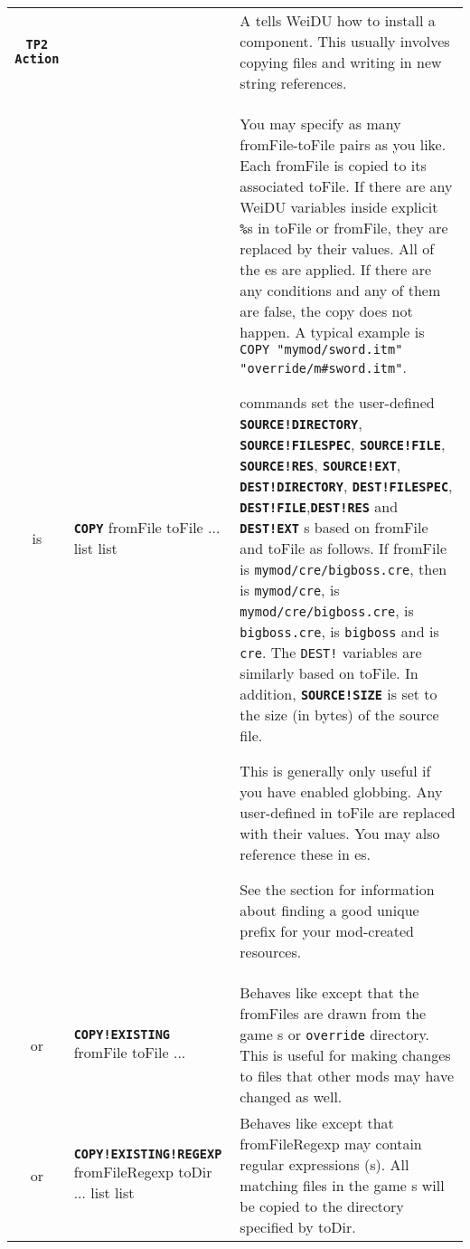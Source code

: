 \documentclass{article}
\def\ttref#1{\ahrefloc{#1}{\tt #1}}
\def\DEFINE#1{{\tt \bf #1}\label{#1}\index{#1}}
\def\t#1{{\tt #1}}
\def\Slist{{\color{red} list }}
\begin{document}
\begin{tabular}{cp{10in}|p{10in}}
\DEFINE{TP2 Action} & &
  A \ttref{TP2 Action} tells WeiDU how to install a component. This usually
  involves copying files and writing in new string references. \\

  is & \DEFINE{COPY} \ttref{optNoBackup}
                     \ttref{optGlob} fromFile toFile ...
       \ttref{patch} \Slist
       \ttref{when} \Slist &
       You may specify as many fromFile-toFile pairs as you like. Each
       fromFile is copied to its associated toFile. If there are any WeiDU
       variables inside explicit \t{\%}s in toFile or fromFile, they are
       replaced by their values. All of the
       \ttref{patch}es are applied. If there are any \ttref{when}
       conditions and any of them are false, the copy does not happen.
       A typical example is \t{COPY "mymod/sword.itm"
       "override/m\#sword.itm"}.


       \ttref{COPY} commands set the user-defined \DEFINE{SOURCE!DIRECTORY},
       \DEFINE{SOURCE!FILESPEC}, \DEFINE{SOURCE!FILE},
       \DEFINE{SOURCE!RES}, \DEFINE{SOURCE!EXT},
       \DEFINE{DEST!DIRECTORY}, \DEFINE{DEST!FILESPEC},
       \DEFINE{DEST!FILE},\DEFINE{DEST!RES} and \DEFINE{DEST!EXT}
       \ttref{variable}s based on fromFile and toFile as follows. If
       fromFile is \t{mymod/cre/bigboss.cre}, then
       \ttref{SOURCE!DIRECTORY} is \t{mymod/cre},
       \ttref{SOURCE!FILESPEC} is \t{mymod/cre/bigboss.cre},
       \ttref{SOURCE!FILE} is \t{bigboss.cre},
       \ttref{SOURCE!RES} is \t{bigboss} and \ttref{SOURCE!EXT} is \t{cre}.
       The \t{DEST!} variables
       are similarly based on toFile. In addition, \DEFINE{SOURCE!SIZE} is
       set to the size (in bytes) of the source file.


       This is generally only useful if you have enabled globbing. Any
       user-defined \ttref{variables} in toFile are replaced with their
       values. You may also reference these \ttref{variables} in
       \ttref{patch}es.


       See the \ttref{Module Distribution} section for information about
       finding a good unique prefix for your mod-created resources.
       \\
  or & \DEFINE{COPY!EXISTING} \ttref{optNoBackup} fromFile toFile ...
        &
       Behaves like \ttref{COPY} except that the fromFiles are drawn from
       the game \ttref{BIFF}s or \t{override} directory. This is useful for
       making changes to files that other mods may have changed as well.
       \\
  or & \DEFINE{COPY!EXISTING!REGEXP} \ttref{optNoBackup} \ttref{optGlob} fromFileRegexp toDir ...
       \ttref{patch} \Slist
       \ttref{when} \Slist &
       Behaves like \ttref{COPY!EXISTING} except that fromFileRegexp may
       contain regular expressions (\ttref{regexp}s). All matching files in
       the game \ttref{BIFF}s will be copied to the directory specified by
       toDir.



\end{tabular}
\end{document}
